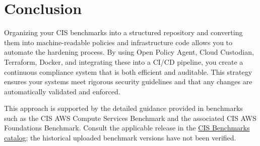\documentclass[12pt]{article}
\begin{document}
\section{Conclusion}
Organizing your CIS benchmarks into a structured repository and converting them into machine-readable policies and infrastructure code allows you to automate the hardening process. By using Open Policy Agent, Cloud Custodian, Terraform, Docker, and integrating these into a CI/CD pipeline, you create a continuous compliance system that is both efficient and auditable. This strategy ensures your systems meet rigorous security guidelines and that any changes are automatically validated and enforced.

\bigskip

This approach is supported by the detailed guidance provided in benchmarks such as the CIS AWS Compute Services Benchmark and the associated CIS AWS Foundations Benchmark. Consult the applicable release in the \href{https://www.cisecurity.org/cis-benchmarks}{CIS Benchmarks catalog}; the historical uploaded benchmark versions have not been verified.
\end{document}
